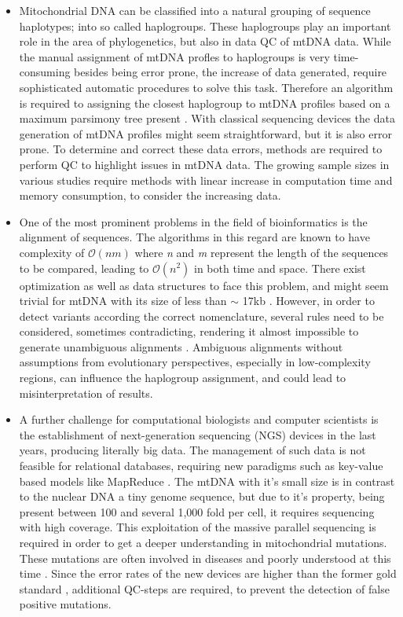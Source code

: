 \begin{itemize}
\item 
Mitochondrial DNA can be classified into a natural grouping of sequence haplotypes; into so called haplogroups. These haplogroups play an important role in the area of phylogenetics, but also in data QC of mtDNA data. While the manual assignment of mtDNA profles to haplogroups is very time-consuming besides being error prone, the increase of data generated, require sophisticated automatic procedures to solve this task. Therefore an algorithm is required to assigning the closest haplogroup to mtDNA profiles based on a maximum parsimony tree present \cite{VanOven2009}. With classical sequencing devices the data generation of mtDNA profiles might seem straightforward, but it is also error prone. To determine and correct these data errors, methods are required to perform QC to highlight issues in mtDNA data. The growing sample sizes in various studies require methods with linear increase in computation time and memory consumption, to consider the increasing data. 
\item 
One of the most prominent problems in the field of bioinformatics is the alignment of sequences. The algorithms in this regard are known to have complexity of $\mathcal O(nm)$ where \textit{n} and \textit{m} represent the length of the sequences to be compared, leading to $\mathcal O(n^2)$ in both time and space. There exist optimization as well as data structures to face this problem, and might seem trivial for mtDNA with its size of less than $\sim$ 17kb \cite{Andrews1999}. However, in order to detect variants according the correct nomenclature, several rules need to be considered, sometimes contradicting, rendering it almost impossible to generate unambiguous alignments \cite{Bandelt2008}. Ambiguous alignments without assumptions from evolutionary perspectives, especially in low-complexity regions, can influence the haplogroup assignment, and could lead to misinterpretation of results.  
\item 
A further challenge for computational biologists and computer scientists is the establishment of next-generation sequencing (NGS) devices in the last years, producing literally big data. The management of such data is not feasible for relational databases, requiring new paradigms such as key-value based models like MapReduce \cite{Dean2008}. The mtDNA with it's small size is in contrast to the nuclear DNA a tiny genome sequence, but due to it's property, being present between 100 and several 1,000 fold per cell, it requires sequencing with high coverage. This exploitation of the massive parallel sequencing is required in order to get a deeper understanding in mitochondrial mutations. These mutations are often involved in diseases and poorly understood at this time \cite{Wallace2013}. Since the error rates of the new devices are higher than the former gold standard \cite{Wang2011}, additional QC-steps are required, to prevent the detection of false positive mutations. 

\end{itemize}

